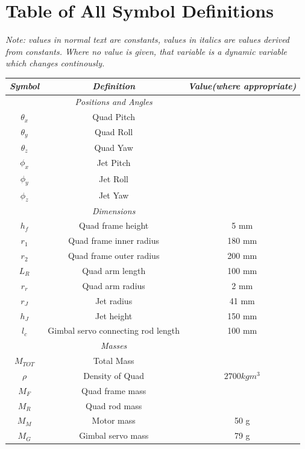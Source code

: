 \documentclass[10pt]{article}
\begin{document}
\newpage
\appendix
\section{Table of All Symbol Definitions}
\begin{center}
    \emph{Note: values in normal text are constants, values in italics are values derived from constants. Where no value is given, that variable is a dynamic variable which changes continously.}
\begin{longtable}{|ccc|}
    \hline
    \emph{Symbol} & \emph{Definition} & \emph{Value(where appropriate)} \\
    \hline \endhead
    & \emph{Positions and Angles} & \\
    \hline
    $\theta_x$ & Quad Pitch & \\
    $\theta_y$ & Quad Roll & \\
    $\theta_z$ & Quad Yaw & \\
    $\phi_x$ & Jet Pitch & \\
    $\phi_y$ & Jet Roll & \\
    $\phi_z$ & Jet Yaw & \\
    \hline
    & \emph{Dimensions} & \\
    \hline
    $h_f$ & Quad frame height & 5 mm \\
    $r_1$ & Quad frame inner radius & 180 mm \\
    $r_2$ & Quad frame outer radius & 200 mm \\
    $L_R$ & Quad arm length & 100 mm \\
    $r_r$ & Quad arm radius & 2 mm \\
    $r_J$ & Jet radius & 41 mm \\
    $h_J$ & Jet height & 150 mm \\
    $l_c$ & Gimbal servo connecting rod length & 100 mm \\
    \hline
    & \emph{Masses} & \\
    \hline
    $M_{TOT}$ & Total Mass & \\
    $\rho$ & Density of Quad & $2700 kgm^3$ \\
    $M_F$ & Quad frame mass & \\
    $M_R$ & Quad rod mass & \\
    $M_M$ & Motor mass & 50 g \\
    $M_G$ & Gimbal servo mass & 79 g \\

\end{longtable}
\end{center}
\end{document}

